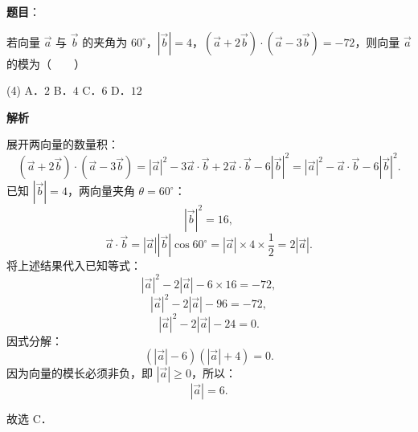 \begin{answer}

\textbf{题目}：

若向量 $\vec{a}$ 与 $\vec{b}$ 的夹角为 $60^\circ$，$|\vec{b}| = 4$，$(\vec{a} + 2\vec{b}) \cdot (\vec{a} - 3\vec{b}) = -72$，则向量 $\vec{a}$ 的模为\mbox{（　　）}

\begin{gkopts}(4)
\task A．$2$
\task B．$4$
\task C．$6$
\task D．$12$
\end{gkopts}

\textbf{解析}

展开两向量的数量积：
\nopagebreak[4]
\[
(\vec{a} + 2\vec{b}) \cdot (\vec{a} - 3\vec{b}) = |\vec{a}|^2 - 3\vec{a} \cdot \vec{b} + 2\vec{a} \cdot \vec{b} - 6|\vec{b}|^2 = |\vec{a}|^2 - \vec{a} \cdot \vec{b} - 6|\vec{b}|^2.
\]
已知 $|\vec{b}| = 4$，两向量夹角 $\theta = 60^\circ$：
\nopagebreak[4]
\[
|\vec{b}|^2 = 16,
\]
\nopagebreak[4]
\[
\vec{a} \cdot \vec{b} = |\vec{a}| |\vec{b}| \cos 60^\circ = |\vec{a}| \times 4 \times \frac{1}{2} = 2|\vec{a}|.
\]
将上述结果代入已知等式：
\nopagebreak[4]
\[
|\vec{a}|^2 - 2|\vec{a}| - 6 \times 16 = -72,
\]
\nopagebreak[4]
\[
|\vec{a}|^2 - 2|\vec{a}| - 96 = -72,
\]
\nopagebreak[4]
\[
|\vec{a}|^2 - 2|\vec{a}| - 24 = 0.
\]
因式分解：
\nopagebreak[4]
\[
(|\vec{a}| - 6)(|\vec{a}| + 4) = 0.
\]
因为向量的模长必须非负，即 $|\vec{a}| \geqslant 0$，所以：
\nopagebreak[4]
\[
|\vec{a}| = 6.
\]

故选 C．


\end{answer}

